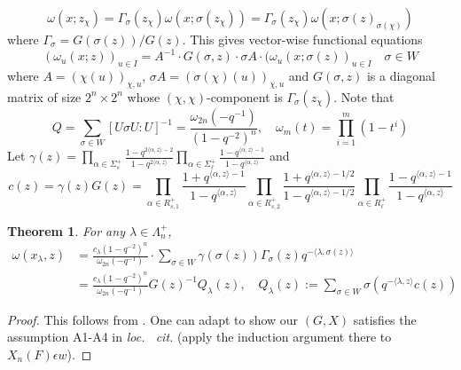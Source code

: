 \documentclass{amsart}
\newtheorem{theorem}{Theorem}[section]
\theoremstyle{definition}
\theoremstyle{remark}
\newcommand{\1}{\mathbf{1}}
\theoremstyle{definition}
\begin{document}
\[\omega(x;z_\chi)=\Gamma_\sigma(z_\chi)\omega(x;\sigma(z_\chi))=\Gamma_\sigma(z_\chi)\omega(x;\sigma(z)_{\sigma(\chi)})\]
where $\Gamma_\sigma=G(\sigma(z))/G(z)$. This gives vector-wise functional equations
\[(\omega_u(x;z))_{u\in I}=A^{-1}\cdot G(\sigma,z)\cdot \sigma{A}\cdot (\omega_u(x;\sigma(z))_{u\in I} \quad \sigma\in W\]
 where $A=(\chi(u))_{\chi, u}$, $\sigma{A}=(\sigma(\chi)(u))_{\chi,u}$
 and $G(\sigma,z)$ is a diagonal matrix of size $2^n\times 2^n$
whose $(\chi,\chi)$-component is $\Gamma_\sigma(z_\chi)$.  Note that 
\[Q=\sum_{\sigma\in W}[U\sigma U: U]^{-1}=\frac{\omega_{2n}(-q^{-1})}{(1-q^{-2})^n},\quad \omega_m(t)=\prod_{i=1}^m(1-t^i)\]
Let $\gamma(z)=\prod_{\alpha\in\Sigma_s^+}\frac{1-q^{2\langle\alpha,z\rangle-2}}{1-q^{2\langle\alpha,z\rangle}}\prod_{\alpha\in\Sigma_\ell^+}\frac{1-q^{\langle\alpha,z\rangle-1}}{1-q^{\langle\alpha,z\rangle}}$ and \[c(z)=\gamma(z)G(z)=\prod_{\alpha\in R_{s,1}^+}\frac{1+q^{\langle\alpha,z\rangle-1}}{1-q^{\langle\alpha,z\rangle}}\prod_{\alpha\in R_{s,2}^+}\frac{1+q^{\langle \alpha,z\rangle-1/2}}{1-q^{\langle\alpha,z\rangle-1/2}} \prod_{\alpha\in R_\ell^+}\frac{1-q^{\langle\alpha,z\rangle-1}}{1-q^{\langle\alpha,z\rangle}}\]



\begin{theorem}\label{FE1} For any $\lambda\in\Lambda_n^+$, \begin{align*}
    \omega(x_\lambda,z)&=\frac{c_\lambda(1-q^{-2})^n}{\omega_{2n}(-q^{-1})}\cdot\sum_{\sigma\in W}\gamma(\sigma(z))\Gamma_\sigma(z)q^{-\langle \lambda,\sigma(z)\rangle}\\
    &=\frac{c_\lambda(1-q^{-2})^n}{\omega_{2n}(-q^{-1})}G(z)^{-1}Q_\lambda(z),\quad Q_\lambda(z):=\sum_{\sigma\in W}\sigma(q^{-\langle\lambda,z\rangle}c(z)) 
\end{align*}
\end{theorem}
\begin{proof}This follows from \cite[Thm 2.6]{Hir10}. One can adapt  \cite[Section 3.2]{HK14} to show our $(G, X)$ satisfies the assumption A1-A4 in \emph{loc.~ cit.} (apply the  induction argument there to $X_n(F)\epsilon w$).
\end{proof}
\end{document}
